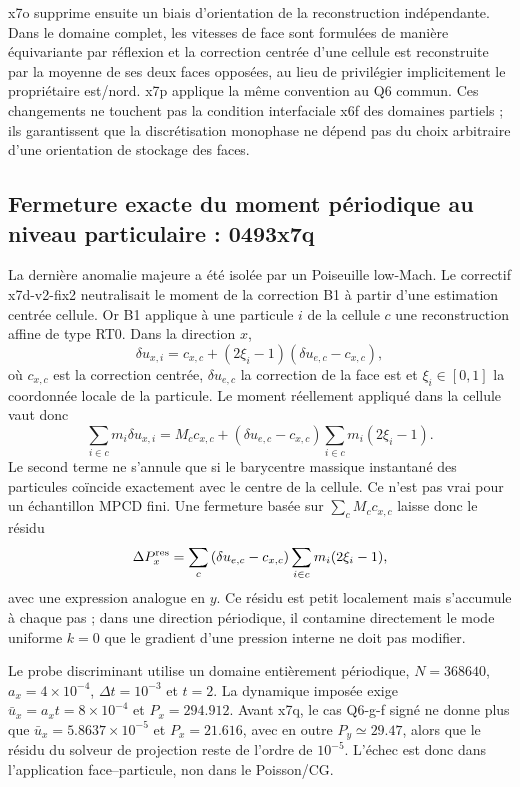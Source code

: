 \documentclass[11pt,a4paper]{article}
\begin{document}
x7o supprime ensuite un biais d'orientation de la reconstruction indépendante. Dans le domaine complet, les vitesses de face sont formulées de manière équivariante par réflexion et la correction centrée d'une cellule est reconstruite par la moyenne de ses deux faces opposées, au lieu de privilégier implicitement le propriétaire est/nord. x7p applique la même convention au Q6 commun. Ces changements ne touchent pas la condition interfaciale x6f des domaines partiels ; ils garantissent que la discrétisation monophase ne dépend pas du choix arbitraire d'une orientation de stockage des faces.

\subsection{Fermeture exacte du moment périodique au niveau particulaire : 0493x7q}

La dernière anomalie majeure a été isolée par un Poiseuille low-Mach. Le correctif x7d-v2-fix2 neutralisait le moment de la correction B1 à partir d'une estimation centrée cellule. Or B1 applique à une particule $i$ de la cellule $c$ une reconstruction affine de type RT0. Dans la direction $x$,
\begin{equation}
 \delta u_{x,i}
 = c_{x,c} + (2\xi_i-1)\left(\delta u_{e,c}-c_{x,c}\right),
\end{equation}
où $c_{x,c}$ est la correction centrée, $\delta u_{e,c}$ la correction de la face est et $\xi_i\in[0,1]$ la coordonnée locale de la particule. Le moment réellement appliqué dans la cellule vaut donc
\begin{equation}
 \sum_{i\in c}m_i\delta u_{x,i}
 = M_c c_{x,c}
 + \left(\delta u_{e,c}-c_{x,c}\right)
   \sum_{i\in c}m_i(2\xi_i-1).
\end{equation}
Le second terme ne s'annule que si le barycentre massique instantané des particules coïncide exactement avec le centre de la cellule. Ce n'est pas vrai pour un échantillon MPCD fini. Une fermeture basée sur $\sum_c M_cc_{x,c}$ laisse donc le résidu
\begin{equation}
 \Delta P_x^{\rm res}
 = \sum_c \left(\delta u_{e,c}-c_{x,c}\right)
   \sum_{i\in c}m_i(2\xi_i-1),
\end{equation}
avec une expression analogue en $y$. Ce résidu est petit localement mais s'accumule à chaque pas ; dans une direction périodique, il contamine directement le mode uniforme $k=0$ que le gradient d'une pression interne ne doit pas modifier.

Le probe discriminant utilise un domaine entièrement périodique, $N=368640$, $a_x=4\times10^{-4}$, $\Delta t=10^{-3}$ et $t=2$. La dynamique imposée exige $\bar u_x=a_xt=8\times10^{-4}$ et $P_x=294.912$. Avant x7q, le cas Q6-g-f signé ne donne plus que $\bar u_x=5.8637\times10^{-5}$ et $P_x=21.616$, avec en outre $P_y\simeq29.47$, alors que le résidu du solveur de projection reste de l'ordre de $10^{-5}$. L'échec est donc dans l'application face--particule, non dans le Poisson/CG.
\end{document}
